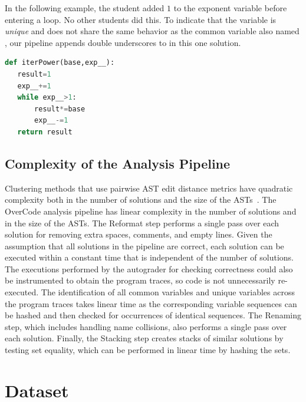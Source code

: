 In the following example, the student added $1$ to the exponent variable before entering a  loop. No other students did this. To indicate that the  variable is {\it unique} and does not share the same behavior as the common variable also named , our pipeline appends double underscores to  in this one solution. 

\begin{minipage}{0.45\linewidth}
\begin{lstlisting}[language=python,linebackgroundcolor={\lstcolorlines[lightyellow]{1,3,4,6}}]
def iterPower(base,exp__):
   result=1
   exp__+=1
   while exp__>1:
       result*=base
       exp__-=1
   return result
\end{lstlisting}
\end{minipage}



\subsection{Complexity of the Analysis Pipeline}\label{complexity}
Clustering methods that use pairwise AST edit distance metrics have quadratic complexity both in the number of solutions and the size of the ASTs~\cite{MOOCshop}. The OverCode analysis pipeline has linear complexity in the number of solutions and in the size of the ASTs. The Reformat step performs a single pass over each solution for removing extra spaces, comments, and empty lines. Given the assumption that all solutions in the pipeline are correct, each solution can be executed within a constant time that is independent of the number of solutions. The executions performed by the autograder for checking correctness could also be instrumented to obtain the program traces, so code is not unnecessarily re-executed. The identification of all common variables and unique variables across the program traces takes linear time as the corresponding variable sequences can be hashed and then checked for occurrences of identical sequences. The Renaming step, which includes handling name collisions, also performs a single pass over each solution. Finally, the Stacking step creates stacks of similar solutions by testing set equality, which can be performed in linear time by hashing the sets.


\section{Dataset} \label{dataset}

